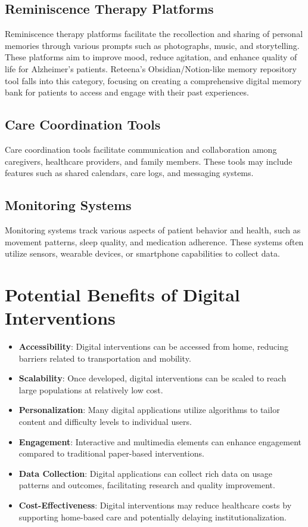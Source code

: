 \subsection{Reminiscence Therapy Platforms}
\begin{tcolorbox}[infobox, title=Focus Area for Reteena]
Reminiscence therapy platforms facilitate the recollection and sharing of personal memories through various prompts such as photographs, music, and storytelling. These platforms aim to improve mood, reduce agitation, and enhance quality of life for Alzheimer's patients. Reteena's Obsidian/Notion-like memory repository tool falls into this category, focusing on creating a comprehensive digital memory bank for patients to access and engage with their past experiences.
\end{tcolorbox}

\subsection{Care Coordination Tools}
Care coordination tools facilitate communication and collaboration among caregivers, healthcare providers, and family members. These tools may include features such as shared calendars, care logs, and messaging systems.

\subsection{Monitoring Systems}
Monitoring systems track various aspects of patient behavior and health, such as movement patterns, sleep quality, and medication adherence. These systems often utilize sensors, wearable devices, or smartphone capabilities to collect data.

\section{Potential Benefits of Digital Interventions}
\begin{itemize}
    \item \textbf{Accessibility}: Digital interventions can be accessed from home, reducing barriers related to transportation and mobility.
    \item \textbf{Scalability}: Once developed, digital interventions can be scaled to reach large populations at relatively low cost.
    \item \textbf{Personalization}: Many digital applications utilize algorithms to tailor content and difficulty levels to individual users.
    \item \textbf{Engagement}: Interactive and multimedia elements can enhance engagement compared to traditional paper-based interventions.
    \item \textbf{Data Collection}: Digital applications can collect rich data on usage patterns and outcomes, facilitating research and quality improvement.
    \item \textbf{Cost-Effectiveness}: Digital interventions may reduce healthcare costs by supporting home-based care and potentially delaying institutionalization.
\end{itemize}

